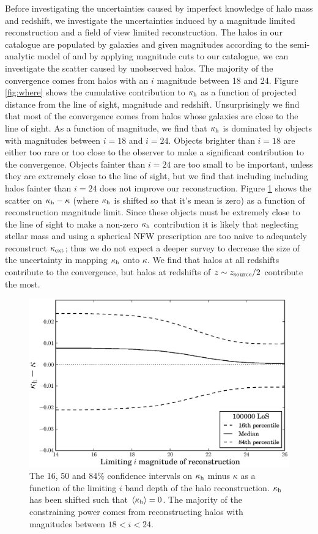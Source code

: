 \documentclass[useAMS,usenatbib]{mn2e}
\begin{document}
Before investigating the uncertainties caused by imperfect knowledge of halo mass and redshift, we investigate the uncertainties induced by a magnitude limited reconstruction and a field of view limited reconstruction. The halos in our catalogue are populated by galaxies and given magnitudes according to the semi-analytic model of \citet{deLucia+Blaizot2007} and by applying magnitude cuts to our catalogue, we can investigate the scatter caused by unobserved halos. The majority of the convergence comes from halos with an $i$ magnitude between 18 and 24. Figure \ref{fig:where} shows the cumulative contribution to $\kappa_{\rm h}$ as a function of projected distance from the line of sight, magnitude and redshift. Unsurprisingly we find that most of the convergence comes from halos whose galaxies are close to the line of sight. As a function of magnitude, we find that $\kappa_{\rm h}$ is dominated by objects with magnitudes between $i=18$ and $i=24$. Objects brighter than $i=18$ are either too rare or too close to the observer to make a significant contribution to the convergence. Objects fainter than $i=24$ are too small to be important, unless they are extremely close to the line of sight, but we find that including including halos fainter than $i=24$ does not improve our reconstruction. Figure \ref{fig:magcut} shows the scatter on $\kappa_{\rm h}-\kappa$ (where $\kappa_{\rm h}$ is shifted so that it's mean is zero) as a function of reconstruction magnitude limit. Since these objects must be extremely close to the line of sight to make a non-zero $\kappa_{\rm h}$ contribution it is likely that neglecting stellar mass and using a spherical NFW prescription are too naive to adequately reconstruct $\kappa_{\rm ext}$; thus we do not expect a deeper survey to decrease the size of the uncertainty in mapping $\kappa_{\rm h}$ onto $\kappa$. We find that halos at all redshifts contribute to the convergence, but halos at redshifts of $z \sim z_{\rm source}/2$ contribute the most.  

\begin{figure}
\includegraphics[width=\columnwidth]{figs/mag_scatter.eps}
\caption[magcut]{The 16, 50 and 84\% confidence intervals on $\kappa_{\rm h}$ minus $\kappa$ as a function of the limiting $i$ band depth of the halo reconstruction. $\kappa_{\rm h}$ has been shifted such that $\left\langle\kappa_{\rm h}\right\rangle=0$. The majority of the constraining power comes from reconstructing halos with magnitudes between $18<i<24$.}
\label{fig:magcut}
\end{figure}
\end{document}
